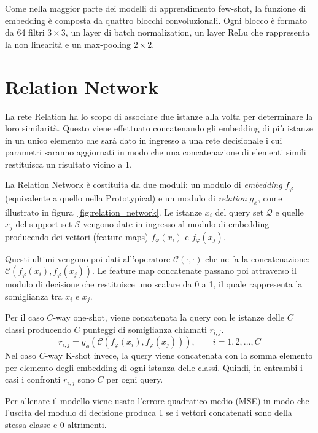 \documentclass[12pt,a4paper,titlepage]{article}
\begin{document}
Come nella maggior parte dei modelli di apprendimento few-shot, la funzione di embedding è composta da quattro blocchi convoluzionali. Ogni blocco è formato da 64 filtri $3 \times 3$, un layer di batch normalization, un layer ReLu che rappresenta la non linearità e un max-pooling $2 \times 2$.

\clearpage

\section{Relation Network}
\label{sec:relation}
La rete Relation ha lo scopo di associare due istanze alla volta per determinare la loro similarità.
Questo viene effettuato concatenando gli embedding di più istanze in un unico elemento che sarà dato in ingresso a una rete decisionale i cui parametri saranno aggiornati in modo che una concatenazione di elementi simili restituisca un risultato vicino a 1.

La Relation Network è costituita da due moduli: un modulo di \emph{embedding} $f_\varphi$ (equivalente a quello nella Prototypical) e un modulo di \emph{relation} $g_\phi$, come illustrato in figura~\ref{fig:relation_network}.
Le istanze $x_i$ del query set $\mathcal{Q}$ e quelle $x_j$ del support set $\mathcal{S}$ vengono date in ingresso al modulo di embedding producendo dei vettori (feature maps) $f_\varphi(x_i)$ e $f_\varphi(x_j)$.

Questi ultimi vengono poi dati all'operatore $\mathcal{C}(\cdot ,\cdot)$ che ne fa la concatenazione: $\mathcal{C}(f_\varphi(x_i),f_\varphi(x_j))$.
Le feature map concatenate passano poi attraverso il modulo di decisione che restituisce uno scalare da 0 a 1, il quale rappresenta la somiglianza tra $x_i$ e $x_j$.

Per il caso $C$-way one-shot, viene concatenata la query con le istanze delle $C$ classi producendo $C$ punteggi di somiglianza chiamati $r_{i,j}$.
\begin{equation}
	r_{i,j}=g_\phi(\mathcal{C}(f_\varphi(x_i),f_\varphi(x_j))),  \qquad i = 1, 2, \dots, C
\end{equation}
Nel caso $C$-way K-shot invece, la query viene concatenata con la somma elemento per elemento degli embedding di ogni istanza delle classi. Quindi, in entrambi i casi i confronti $r_{i,j}$ sono $C$ per ogni query.

Per allenare il modello viene usato l'errore quadratico medio (MSE) in modo che l'uscita del modulo di decisione produca 1 se i vettori concatenati sono della stessa classe e 0 altrimenti.
\end{document}
